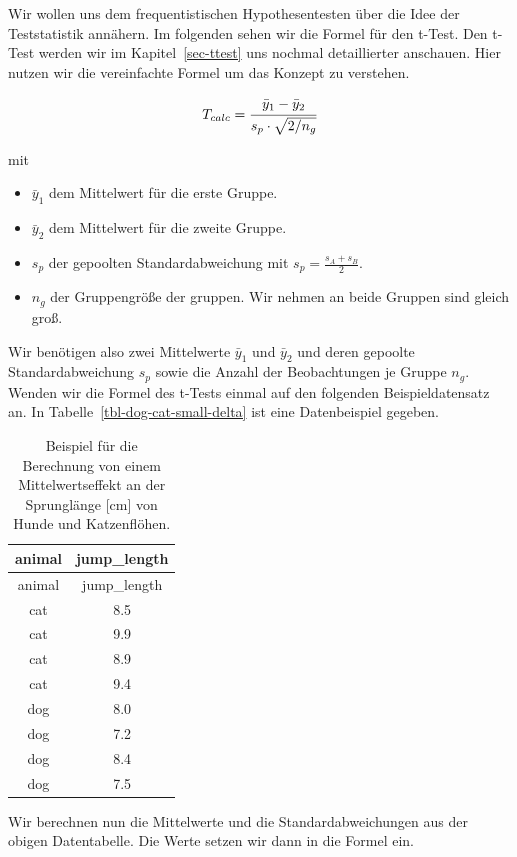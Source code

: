 \documentclass[
  letterpaper,
]{scrbook}
\providecommand{\tightlist}{%
  \setlength{\itemsep}{0pt}\setlength{\parskip}{0pt}}\usepackage{longtable,booktabs,array}
\begin{document}
Wir wollen uns dem frequentistischen Hypothesentesten über die Idee der
Teststatistik annähern. Im folgenden sehen wir die Formel für den
t-Test. Den t-Test werden wir im Kapitel~\ref{sec-ttest} uns nochmal
detaillierter anschauen. Hier nutzen wir die vereinfachte Formel um das
Konzept zu verstehen.

\[
T_{calc}=\cfrac{\bar{y}_1-\bar{y}_2}{s_{p} \cdot \sqrt{2/n_g}}
\]

mit

\begin{itemize}
\tightlist
\item
  \(\bar{y}_1\) dem Mittelwert für die erste Gruppe.
\item
  \(\bar{y}_2\) dem Mittelwert für die zweite Gruppe.
\item
  \(s_{p}\) der gepoolten Standardabweichung mit
  \(s_p = \tfrac{s_A + s_B}{2}\).
\item
  \(n_g\) der Gruppengröße der gruppen. Wir nehmen an beide Gruppen sind
  gleich groß.
\end{itemize}

Wir benötigen also zwei Mittelwerte \(\bar{y}_1\) und \(\bar{y}_2\) und
deren gepoolte Standardabweichung \(s_p\) sowie die Anzahl der
Beobachtungen je Gruppe \(n_g\). Wenden wir die Formel des t-Tests
einmal auf den folgenden Beispieldatensatz an. In
Tabelle~\ref{tbl-dog-cat-small-delta} ist eine Datenbeispiel gegeben.

\hypertarget{tbl-dog-cat-small}{}
\begin{longtable}[]{@{}cc@{}}
\caption{\label{tbl-dog-cat-small}Beispiel für die Berechnung von einem
Mittelwertseffekt an der Sprunglänge {[}cm{]} von Hunde und
Katzenflöhen.}\tabularnewline
\toprule()
animal & jump\_length \\
\midrule()
\endfirsthead
\toprule()
animal & jump\_length \\
\midrule()
\endhead
cat & 8.5 \\
cat & 9.9 \\
cat & 8.9 \\
cat & 9.4 \\
dog & 8.0 \\
dog & 7.2 \\
dog & 8.4 \\
dog & 7.5 \\
\bottomrule()
\end{longtable}

Wir berechnen nun die Mittelwerte und die Standardabweichungen aus der
obigen Datentabelle. Die Werte setzen wir dann in die Formel ein.
\end{document}
